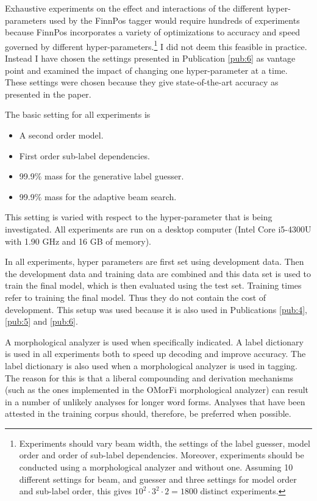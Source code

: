 Exhaustive experiments on the effect and interactions of the different
hyper-parameters used by the Finn\-Pos tagger would require hundreds of
experiments because FinnPos incorporates a variety of optimi\-zations to
accuracy and speed governed by different
hyper-parameters.\footnote{Experiments should vary beam width, the
  settings of the label guesser, model order and order of sub-label
  dependencies. Moreover, experiments should be conducted using a
  morphological analyzer and without one. Assuming 10 different
  settings for beam, and guesser and three settings for model order
  and sub-label order, this gives $10^2\cdot 3^2 \cdot 2 = 1800$
  distinct experiments.} I did not deem this feasible in
practice. Instead I have chosen the settings presented in Publication
\ref{pub:6} as vantage point and examined the impact of changing one
hyper-parameter at a time. These settings were chosen because they
give state-of-the-art accuracy as presented in the paper.

The basic setting for all experiments is 
\begin{itemize}
\item A second order model.
\item First order sub-label dependencies.
\item 99.9\% mass for the generative label guesser.
\item 99.9\% mass for the adaptive beam search.
\end{itemize}
This setting is varied with respect to the hyper-parameter that is
being investigated. All experiments are run on a desktop computer
(Intel Core i5-4300U with 1.90 GHz and 16 GB of memory).

In all experiments, hyper parameters are first set using development
data. Then the development data and training data are combined and
this data set is used to train the final model, which is then
evaluated using the test set. Training times refer to training the
final model. Thus they do not contain the cost of development. This
setup was used because it is also used in Publications \ref{pub:4},
\ref{pub:5} and \ref{pub:6}.

A morphological analyzer is used when specifically indicated. A label
dictionary is used in all experiments both to speed up decoding and
improve accuracy. The label dictionary is also used when a
morphological analyzer is used in tagging. The reason for this is that
a liberal compounding and derivation mechanisms (such as the ones
implemented in the OMorFi morphological analyzer) can result in a
number of unlikely analyses for longer word forms. Analyses that have
been attested in the training corpus should, therefore, be preferred
when possible.

